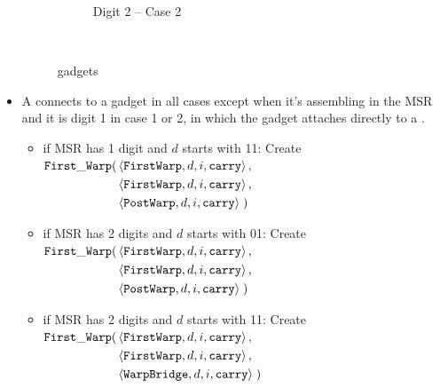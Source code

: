 \begin{itemize}
\begin{figure}[H]
\begin{subfigure}[t]{0.2\textwidth}
                    \caption{\label{fig:warping/pre_warp_case2_digit2_msr} Digit 2 -- Case 2}
                \end{subfigure}%
                ~
                \caption{\label{fig:pre_warp_gadgets} {\prewarp} gadgets }
            \end{figure}


            \item A {\firstwarp} connects to a {\warpbridge} gadget in all cases except when it's assembling
                  in the MSR and it is digit 1 in case 1 or 2, in which the {\firstwarp} gadget attaches directly
                  to a {\postwarp}.

            \begin{itemize}
                \item if MSR has 1 digit and $d$ starts with 11: Create
                $\begin{aligned}[t]
                    {\tt First\_Warp}(& \left\langle {\tt FirstWarp}, d, i, {\tt carry} \right\rangle, \\
                               & \left\langle {\tt FirstWarp}, d, i, {\tt carry} \right\rangle, \\
                               & \left\langle {\tt PostWarp}, d, i, {\tt carry} \right\rangle \;)
                \end{aligned}$
                \vspace{.5cm}


                \item if MSR has 2 digits and $d$ starts with 01: Create
                $\begin{aligned}[t]
                    {\tt First\_Warp}(& \left\langle {\tt FirstWarp}, d, i, {\tt carry} \right\rangle, \\
                    & \left\langle {\tt FirstWarp}, d, i, {\tt carry} \right\rangle, \\
                    & \left\langle {\tt PostWarp}, d, i, {\tt carry} \right\rangle \;)
                \end{aligned}$
                \vspace{.5cm}


                \item if MSR has 2 digits and $d$ starts with 11: Create
                $\begin{aligned}[t]
                    {\tt First\_Warp}(& \left\langle {\tt FirstWarp}, d, i, {\tt carry} \right\rangle, \\
                    & \left\langle {\tt FirstWarp}, d, i, {\tt carry} \right\rangle, \\
                    & \left\langle {\tt WarpBridge}, d, i, {\tt carry} \right\rangle \;)
                \end{aligned}$
                \vspace{.5cm}


\end{itemize}
\end{itemize}

